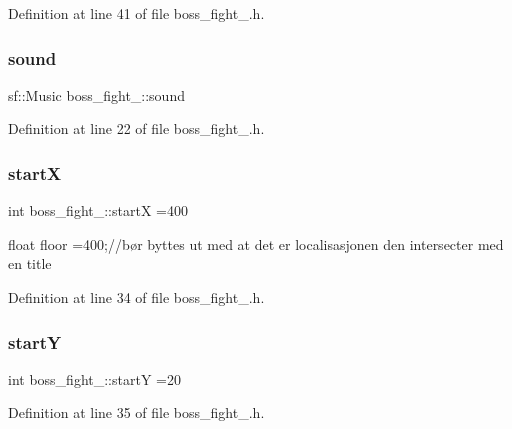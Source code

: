 Definition at line 41 of file boss\+\_\+fight\+\_.\+h.

\hypertarget{classboss__fight__3_ae053483e317a20358d3df14f6f9b2945}{}\label{classboss__fight__3_ae053483e317a20358d3df14f6f9b2945} 
\subsubsection{\texorpdfstring{sound}{sound}}
{\footnotesize\ttfamily sf\+::\+Music boss\+\_\+fight\+\_\+::sound}



Definition at line 22 of file boss\+\_\+fight\+\_.\+h.

\hypertarget{classboss__fight__3_a9b5d173179bff91703b1c0093de3c7b9}{}\label{classboss__fight__3_a9b5d173179bff91703b1c0093de3c7b9} 
\subsubsection{\texorpdfstring{startX}{startX}}
{\footnotesize\ttfamily int boss\+\_\+fight\+\_\+::startX =400}



float floor =400;//bør byttes ut med at det er localisasjonen den intersecter med en title 



Definition at line 34 of file boss\+\_\+fight\+\_.\+h.

\hypertarget{classboss__fight__3_aba10025ed72c90bc57d0577f31383976}{}\label{classboss__fight__3_aba10025ed72c90bc57d0577f31383976} 
\subsubsection{\texorpdfstring{startY}{startY}}
{\footnotesize\ttfamily int boss\+\_\+fight\+\_\+::startY =20}



Definition at line 35 of file boss\+\_\+fight\+\_.\+h.

\hypertarget{classboss__fight__3_a8f4f2db36bc7a685b1565dd5d7744106}{}\label{classboss__fight__3_a8f4f2db36bc7a685b1565dd5d7744106} 
